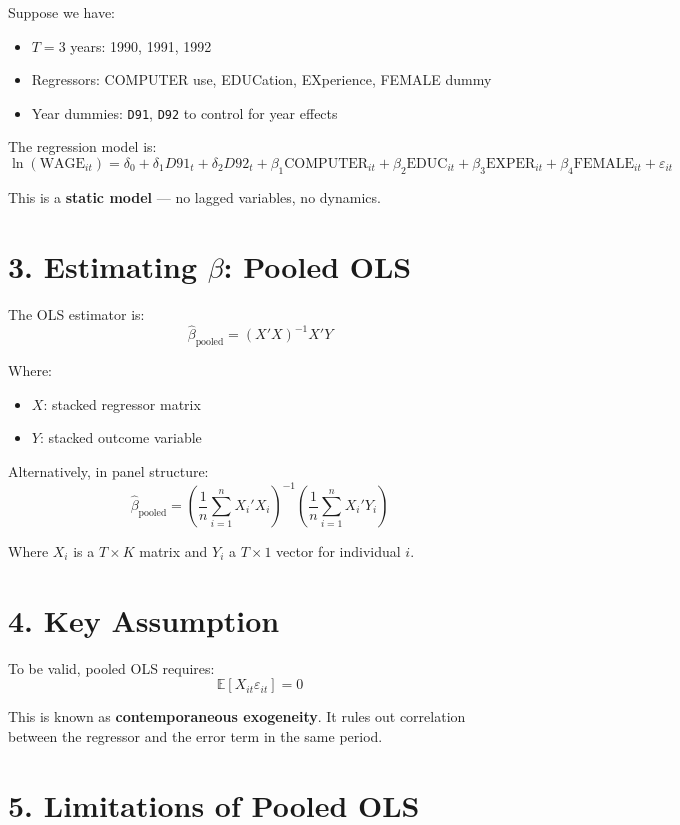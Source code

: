 \documentclass[12pt, oneside]{article}
\begin{document}
Suppose we have:
\begin{itemize}
  \item \( T = 3 \) years: 1990, 1991, 1992
  \item Regressors: COMPUTER use, EDUCation, EXperience, FEMALE dummy
  \item Year dummies: \texttt{D91}, \texttt{D92} to control for year effects
\end{itemize}

The regression model is:
\[
\ln(\text{WAGE}_{it}) = \delta_0 + \delta_1 D91_t + \delta_2 D92_t + \beta_1 \text{COMPUTER}_{it} + \beta_2 \text{EDUC}_{it} + \beta_3 \text{EXPER}_{it} + \beta_4 \text{FEMALE}_{it} + \varepsilon_{it}
\]

This is a \textbf{static model} — no lagged variables, no dynamics.

\section*{3. Estimating \( \beta \): Pooled OLS}

The OLS estimator is:
\[
\hat{\beta}_{\text{pooled}} = (X'X)^{-1}X'Y
\]

Where:
\begin{itemize}
  \item \( X \): stacked regressor matrix
  \item \( Y \): stacked outcome variable
\end{itemize}

Alternatively, in panel structure:
\[
\hat{\beta}_{\text{pooled}} = \left( \frac{1}{n} \sum_{i=1}^n X_i'X_i \right)^{-1} \left( \frac{1}{n} \sum_{i=1}^n X_i'Y_i \right)
\]

Where \( X_i \) is a \( T \times K \) matrix and \( Y_i \) a \( T \times 1 \) vector for individual \( i \).

\section*{4. Key Assumption}

To be valid, pooled OLS requires:
\[
\mathbb{E}[X_{it} \varepsilon_{it}] = 0
\]

This is known as \textbf{contemporaneous exogeneity}. It rules out correlation between the regressor and the error term in the same period.

\section*{5. Limitations of Pooled OLS}
\end{document}
